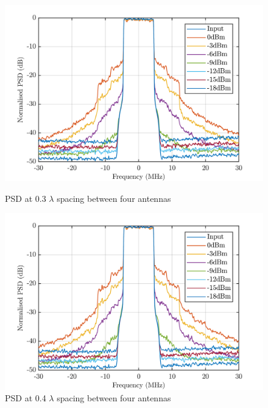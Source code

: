 \begin{figure}[H]
  \centering
  \begin{minipage}[b]{0.5\textwidth}
	\includegraphics[scale = 0.5]{figures/measurement/four_antenna/psd_0p3.png}
	\caption{PSD at 0.3 $\lambda$ spacing between four antennas}
    \label{fig:psd03_4}
  \end{minipage}
  \hfill
  \begin{minipage}[b]{0.4\textwidth}
\includegraphics[scale = 0.5]{figures/measurement/four_antenna/psd_0p4.png}
\caption{PSD at 0.4 $\lambda$ spacing between four antennas}
    \label{fig:psd04_4}
  \end{minipage}
\end{figure}

